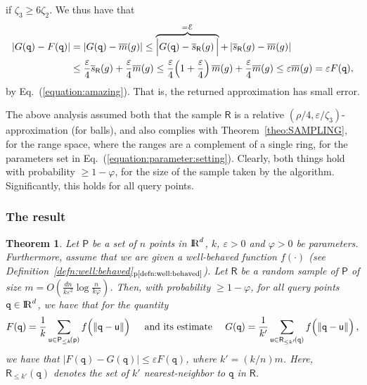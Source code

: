 \documentclass[12pt]{article}
\newtheorem{theorem}{Theorem}[section] \newtheorem{lemma}[theorem]{Lemma}
\theoremstyle{remark}{\theorembodyfont{\rm} \newtheorem{remark}[theorem]{Remark}}
\newcommand{\thmref}[1]{Theorem~\ref{theo:#1}}
\newcommand{\Eqref}[1]{Eq.~(\ref{equation:#1})}
\newcommand{\defrefpage}[1]{Definition~\ref{defn:#1}$_\text{p\pageref{defn:#1}}$}
\newcommand{\MakeBig}{\rule[-.2cm]{0cm}{0.4cm}}
\newcommand{\pth}[2][\!]{#1\left({#2}\right)}
\newcommand{\normY}[2]{\left\lVert {#1} - {#2} \right \rVert}
\newcommand{\cardin}[1]{\left\lvert {#1} \right\rvert}
\newcommand{\eps}{{\varepsilon}}\newcommand{\divides}{|}
\providecommand{\si}[1]{#1}
\renewcommand{\Re}{{\rm I\!\hspace{-0.025em} R}}
\newcommand{\PntSet}{\mathsf{P}}
\newcommand{\query}{\mathtt{q}}
\newcommand{\pnt} {\mathsf{p}}
\newcommand{\pntA}{\mathsf{u}}
\newcommand{\distY}[2]{\normY{#1}{#2}}
\newcommand{\ds}{\displaystyle}
\newcommand{\constC}{\zeta_2}
\newcommand{\constD}{\zeta_3}
\newcommand{\hdim}{d}
\newcommand{\Pk}[2][\!]{\PntSet_{\leq k}\pth[#1]{#2}}
\newcommand{\PkExt}[4][\!]{{#2}_{\leq #3}\pth[#1]{#4}}
\newcommand{\BadProb}{\varphi}
\newcommand{\prob}{\rho}
\newcommand{\MeasureChar}{\overline{m}}
\newcommand{\Measure}[1]{\MeasureChar\pth{#1}}
\newcommand{\sMeasureX}[2]{\overline{s}_{#2}\pth{#1}}
\newcommand{\RSample}{\mathsf{R}}
\newcommand{\Error}{\EuScript{E}}
\begin{document}
if $\constD \geq 6\constC$.  We thus have that\vspace{-0.5cm}\begin{align*}
    \cardin{G(\query) - F(\query)}&= \cardin{G(\query) - \Measure{g}}\leq \overbrace{ \cardin{G(\query) - \sMeasureX{g}{\RSample} \MakeBig
       }}^{=\Error} + \cardin{\sMeasureX{g}{\RSample} - \Measure{g}}\\
    &\leq \frac{\eps}{4} \sMeasureX{g}{\RSample} + \frac{\eps}{4}
    \Measure{g}\leq \frac{\eps}{4} \pth{1+\frac{\eps}{4}} \Measure{g} +\frac{\eps}{4}
    \Measure{g}\leq \eps \Measure{g}=\eps F(\query),
\end{align*}
by \Eqref{amazing}.  That is, the returned approximation has small
error.

The above analysis assumed both that the sample $\RSample$ is a
relative $(\prob/4,\eps/\constD)$-\si{approxima}\-\si{tion} (for
balls), and also complies with \thmref{SAMPLING}, for the range space,
where the ranges are a complement of a single ring, for the parameters
set in \Eqref{parameter:setting}. Clearly, both things hold with
probability $\geq 1-\BadProb$, for the size of the sample taken by the
algorithm. Significantly, this holds for all query points.

\subsubsection{The result}

\begin{theorem}
    Let $\PntSet$ be a set of $n$ points in $\Re^\hdim$, $k$, $\eps >
    0$ and $\BadProb > 0$ be parameters. Furthermore, assume that we
    are given a well-behaved function $f(\cdot)$ (see
    \defrefpage{well:behaved}). Let $\RSample$ be a random sample of
    $\PntSet$ of size $\ds m = O\pth{ \frac{ d n }{k \eps^2 } \log
       \frac{ n}{k \BadProb}}$. Then, with probability $\geq
    1-\BadProb$, for all query points $\query \in \Re^\hdim$, we have
    that for the quantity
    \begin{align*}
        F(\query)=\frac{1}{k}\sum_{\pntA \in \Pk{\pnt}} f\pth{\MakeBig\!
           \distY{\query}{\pntA} }\quad \text{ and its estimate }\quad G(\query)=\frac{1}{k'}\sum_{\pntA \in \PkExt{\RSample}{k'}{\query}}
        f\pth{\distY{\query}{\pntA} \MakeBig\! } ,\end{align*}
    we have that $\cardin{F(\query) - G(\query) }\leq \eps F(\query)$,
    where $k'= (k/n) m$.  Here, $ \PkExt{\RSample}{k'}{\query}$
    denotes the set of $k'$ nearest-neighbor to $\query$ in
    $\RSample$.
\end{theorem}
\end{document}
